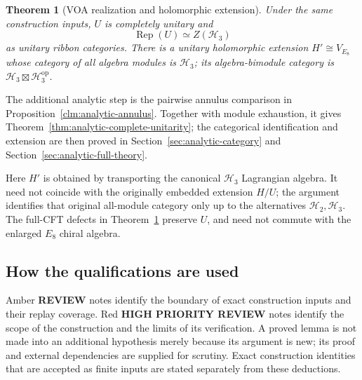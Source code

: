 \documentclass[11pt,a4paper]{article}
\newtheorem{theorem}{Theorem}[section]
\theoremstyle{definition}
\DeclareMathOperator{\Rep}{Rep}
\newcommand{\HH}{\mathcal H}
\begin{document}
\begin{theorem}[VOA realization and holomorphic extension]\label{claim:main}
Under the same construction inputs, $U$ is
completely unitary and
\begin{equation}\label{eq:maincat}
 \Rep(U)\simeq Z(\HH_3)
\end{equation}
as unitary ribbon categories. There is a unitary holomorphic extension
$H'\cong V_{E_8}$ whose category of all algebra modules is $\HH_3$;
its algebra-bimodule category is
$\HH_3\boxtimes\HH_3^{\mathrm{op}}$.
\end{theorem}

The additional analytic step is the pairwise annulus comparison in
Proposition~\ref{clm:analytic-annulus}. Together with module exhaustion,
it gives Theorem~\ref{thm:analytic-complete-unitarity}; the categorical
identification and extension are then proved in
Section~\ref{sec:analytic-category} and
Section~\ref{sec:analytic-full-theory}.

Here \(H'\) is obtained by transporting the canonical \(\HH_3\)
Lagrangian algebra. It need not coincide with the originally embedded
extension \(H/U\); the argument identifies that original
all-module category only up to the alternatives \(\HH_2,\HH_3\).
The full-CFT defects in Theorem~\ref{claim:main} preserve \(U\), and need
not commute with the enlarged \(E_8\) chiral algebra.

\subsection{How the qualifications are used}
Amber \textbf{REVIEW} notes identify the boundary of exact construction
inputs and their replay coverage. Red \textbf{HIGH PRIORITY REVIEW}
notes identify the scope of the construction and the limits of its
verification. A proved lemma is not made into an additional hypothesis
merely because its argument is new; its proof and external dependencies
are supplied for scrutiny. Exact construction identities that are
accepted as finite inputs are stated separately from these deductions.
\end{document}
